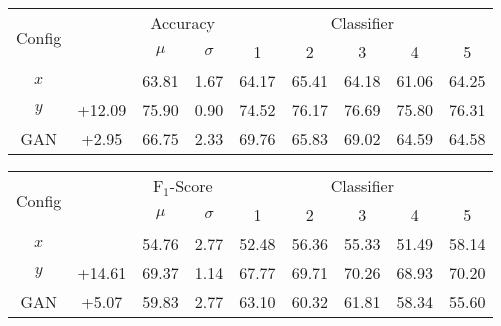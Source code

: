 \pagebreak

\begin{table}[h]
	\begin{center}
		\begin{tabular}{c c c c c c c c c}
			\toprule
			\multirow{2}{*}{Config} &
			 &
			\multicolumn{2}{c}{Accuracy} &
			\multicolumn{5}{c}{Classifier} \\
			\cmidrule(lr){3-4}
			\cmidrule(lr){5-9}
			 & & $\mu$ & $\sigma$ & 1 & 2 & 3 & 4 & 5 \\
			\cmidrule(lr){1-9}
			$x$\hphantom{*} &        & 63.81 & 1.67 & 64.17 & 65.41 & 64.18 & 61.06 & 64.25 \\
			$y$\hphantom{*} & +12.09 & 75.90 & 0.90 & 74.52 & 76.17 & 76.69 & 75.80 & 76.31 \\
			\cmidrule(lr){1-9}
			GAN             & +2.95  & 66.75 & 2.33 & 69.76 & 65.83 & 69.02 & 64.59 & 64.58 \\
			\bottomrule
		\end{tabular}
	\end{center}
	\begin{center}
		\begin{tabular}{c c c c c c c c c}
			\toprule
			\multirow{2}{*}{Config} &
			 &
			\multicolumn{2}{c}{$\text{F}_1$-Score} &
			\multicolumn{5}{c}{Classifier} \\
			\cmidrule(lr){3-4}
			\cmidrule(lr){5-9}
			 & & $\mu$ & $\sigma$ & 1 & 2 & 3 & 4 & 5 \\
			\cmidrule(lr){1-9}
			$x$\hphantom{*} &        & 54.76 & 2.77 & 52.48 & 56.36 & 55.33 & 51.49 & 58.14 \\
			$y$\hphantom{*} & +14.61 & 69.37 & 1.14 & 67.77 & 69.71 & 70.26 & 68.93 & 70.20 \\
			\cmidrule(lr){1-9}
			GAN             & +5.07  & 59.83 & 2.77 & 63.10 & 60.32 & 61.81 & 58.34 & 55.60 \\
			\bottomrule
		\end{tabular}
	\end{center}
\end{table}



